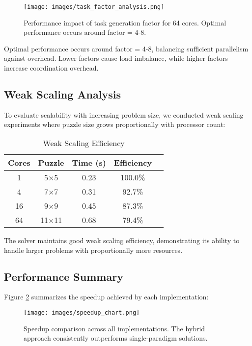 \begin{figure}[htbp]
\centering
\texttt{[image: images/task\_factor\_analysis.png]}
\caption{Performance impact of task generation factor for 64 cores. Optimal performance occurs around factor = 4-8.}
\label{fig:task_factor}
\end{figure}

Optimal performance occurs around factor = 4-8, balancing sufficient parallelism against overhead. Lower factors cause load imbalance, while higher factors increase coordination overhead.

\subsection{Weak Scaling Analysis}
To evaluate scalability with increasing problem size, we conducted weak scaling experiments where puzzle size grows proportionally with processor count:

\begin{table}[htbp]
\caption{Weak Scaling Efficiency}
\begin{center}
\begin{tabular}{@{}ccccc@{}}
\toprule
\textbf{Cores} & \textbf{Puzzle} & \textbf{Time (s)} & \textbf{Efficiency} \\
\midrule
1 & 5×5 & 0.23 & 100.0\% \\
4 & 7×7 & 0.31 & 92.7\% \\
16 & 9×9 & 0.45 & 87.3\% \\
64 & 11×11 & 0.68 & 79.4\% \\
\bottomrule
\end{tabular}
\end{center}
\label{tab:weak_scaling}
\end{table}

The solver maintains good weak scaling efficiency, demonstrating its ability to handle larger problems with proportionally more resources.

\subsection{Performance Summary}
Figure \ref{fig:speedup_comparison} summarizes the speedup achieved by each implementation:

\begin{figure}[htbp]
\centering
\texttt{[image: images/speedup\_chart.png]}
\caption{Speedup comparison across all implementations. The hybrid approach consistently outperforms single-paradigm solutions.}
\label{fig:speedup_comparison}
\end{figure}

